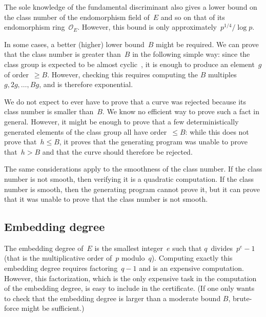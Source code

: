 \documentclass[twocolumn,letterpaper,10pt]{article}
\let\ro\mathcal
\begin{document}
\smallskip

The sole knowledge of the fundamental discriminant also gives a lower bound
on the class number of the endomorphism field of~$E$
and so on that of its endomorphism ring~$\ro O_E$.
However, this bound is only approximately~$p^{1/4}/\log p$.

In some cases, a better (higher) lower bound~$B$ might be required.
We can prove that the class number is greater than~$B$
in the following simple way:
since the class group is expected to be almost cyclic~\cite{nt1984cl},
it is enough to produce an element~$g$ of order~$≥ B$.
However, checking this requires
computing the $B$ multiples~$g, 2g, …, B g$,
and is therefore exponential.

We do not expect to ever have to prove that a curve was rejected
because its class number is smaller than~$B$.
We know no efficient way to prove such a fact in general.
However, it might be enough to prove
that a few deterministically generated elements of the class group
all have order~$≤ B$:
while this does not prove that~$h ≤ B$,
it proves that the generating program was unable to prove that~$h > B$
and that the curve should therefore be rejected.

\smallskip

The same considerations apply to the smoothness of the class number.
If the class number is not smooth, then
verifying it is a quadratic computation.
If the class number is smooth, then
the generating program cannot prove it,
but it can prove that it was unable to prove that
the class number is not smooth.




\subsection{Embedding degree}

The embedding degree of~$E$ is the smallest integer~$e$
such that $q$~divides~$p^{e}-1$
(that is the multiplicative order of~$p$ modulo~$q$).
Computing exactly this embedding degree requires factoring~$q-1$
and is an expensive computation.
However, this factorization, which is the only expensive task
in the computation of the embedding degree,
is easy to include in the certificate.
(If one only wants to check that the embedding degree
is larger than a moderate bound $B$,
brute-force might be sufficient.)
\end{document}
